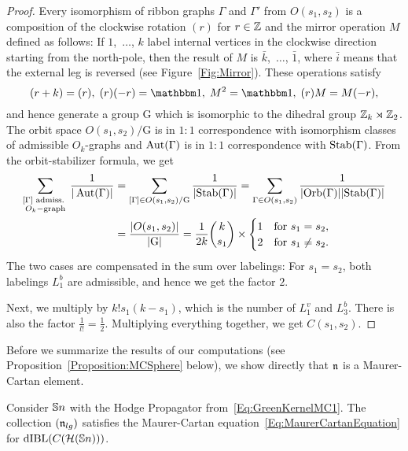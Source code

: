 \documentclass[\MainFolder/Text.tex]{subfiles}
\begin{document}
\begin{proof}
Every isomorphism of ribbon graphs $\Gamma$ and $\Gamma'$ from $O(s_1,s_2)$ is a composition of the clockwise rotation $(r)$ for $r\in \mathbb{Z}$ and the mirror operation $M$ defined as follows: If $1$,~$\dotsc$, $k$ label internal vertices in the clockwise direction starting from the north-pole, then the result of $M$ is $\bar{k}$,~$\dotsc$, $\bar{1}$, where $\bar{i}$ means that the external leg is reversed (see Figure~\ref{Fig:Mirror}). These operations satisfy
$$ (r+k) = (r),\; (r)(-r)=\Id,\; M^2 = \Id,\; (r)M = M(-r), $$
and hence generate a group $\mathrm{G}$ which is isomorphic to the dihedral group $\mathbb{Z}_k \rtimes \mathbb{Z}_2$. The orbit space $O(s_1,s_2)/\mathrm{G}$ is in $1:1$ correspondence with isomorphism classes of admissible $O_k$-graphs and $\operatorname{Aut}(\Gamma)$ is in $1:1$ correspondence with $\mathrm{Stab}(\Gamma)$. From the orbit-stabilizer formula, we get
\allowdisplaybreaks
\begin{align*}
\sum_{\substack{[\Gamma] \text{ admiss. }\\O_k-\text{graph}}} \frac{1}{|\operatorname{Aut}(\Gamma)|} &= \sum_{[\Gamma]\in O(s_1,s_2)/\mathrm{G}} \frac{1}{|\mathrm{Stab}(\Gamma)|} = \sum_{\Gamma\in O(s_1,s_2)} \frac{1}{|\mathrm{Orb}(\Gamma)||\mathrm{Stab}(\Gamma)|} \\ &= \frac{|O(s_1,s_2)|}{|\mathrm{G}|} = \frac{1}{2k}{\binom{k}{s_1}}\times\begin{cases} 1 & \text{for }s_1=s_2, \\ 2 & \text{for }s_1\neq s_2.\end{cases}
\end{align*}
The two cases are compensated in the sum over labelings: For $s_1=s_2$, both labelings $L_1^b$ are admissible, and hence we get the factor $2$.

Next, we multiply by $k! s_1(k-s_1)$, which is the number of $L_1^v$ and $L_3^b$. There is also the factor $\frac{1}{l!} = \frac{1}{2}$. Multiplying everything together, we get $C(s_1,s_2)$.
\end{proof}

Before we summarize the results of our computations (see Proposition~\ref{Proposition:MCSphere} below), we show directly that $\mathfrak{n}$ is a Maurer-Cartan element.


\begin{Lemma} \label{Lem:MCEquation}
Consider $\mathbb{S}{n}$ with the Hodge Propagator from~\eqref{Eq:GreenKernelMC1}. The collection $(\mathfrak{n}_{lg})$ satisfies the Maurer-Cartan equation~\eqref{Eq:MaurerCartanEquation} for $\mathrm{dIBL}(C(\mathcal{H}(\mathbb{S}{n})))$.
\end{Lemma}
\end{document}
